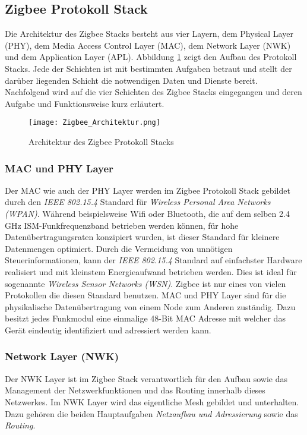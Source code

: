\subsection{Zigbee Protokoll Stack}\label{subsec:ZigbeeProtokollStack}
Die Architektur des Zigbee Stacks besteht aus vier Layern, dem Physical Layer (PHY), dem Media Access Control Layer (MAC), dem Network Layer (NWK) und dem Application Layer (APL).
Abbildung \ref{fig:ArchitekturdesZigbeeProtokollStacks} zeigt den Aufbau des Protokoll Stacks.
Jede der Schichten ist mit bestimmten Aufgaben betraut und stellt der darüber liegenden Schicht die notwendigen Daten und Dienste bereit.
Nachfolgend wird auf die vier Schichten des Zigbee Stacks eingegangen und deren Aufgabe und Funktionsweise kurz erläutert.

\begin{figure}[h]
	\centering
	\texttt{[image: Zigbee\_Architektur.png]}
	\caption{Architektur des Zigbee Protokoll Stacks}
	\label{fig:ArchitekturdesZigbeeProtokollStacks}
\end{figure}

\subsubsection{MAC und PHY Layer}\label{subsubsec:MACundPHYLayer}
Der MAC wie auch der PHY Layer werden im Zigbee Protokoll Stack gebildet durch den \textit{IEEE 802.15.4} Standard für \textit{Wireless Personal Area Networks (WPAN)}.
Während beispielsweise Wifi oder Bluetooth, die auf dem selben 2.4 GHz ISM-Funkfrequenzband betrieben werden können, für hohe Datenübertragungsraten konzipiert wurden, ist dieser Standard für kleinere Datenmengen optimiert.
Durch die Vermeidung von unnötigen Steuerinformationen, kann der \textit{IEEE 802.15.4} Standard auf einfachster Hardware realisiert und mit kleinstem Energieaufwand betrieben werden.
Dies ist ideal für sogenannte \textit{Wireless Sensor Networks (WSN)}.
Zigbee ist nur eines von vielen Protokollen die diesen Standard benutzen.
MAC und PHY Layer sind für die physikalische Datenübertragung von einem Node zum Anderen zuständig.
Dazu besitzt jedes Funkmodul eine einmalige 48-Bit MAC Adresse mit welcher das Gerät eindeutig identifiziert und adressiert werden kann. \cite{markus_krause_rainer_konrad_ieee_2014}


\subsubsection{Network Layer (NWK)}\label{subsubsec:Network Layer}
Der NWK Layer ist im Zigbee Stack verantwortlich für den Aufbau sowie das Management der Netzwerkfunktionen und das Routing innerhalb dieses Netzwerkes.
Im NWK Layer wird das eigentliche Mesh gebildet und unterhalten. Dazu gehören die beiden Hauptaufgaben \textit{Netzaufbau und Adressierung} sowie das \textit{Routing}.

